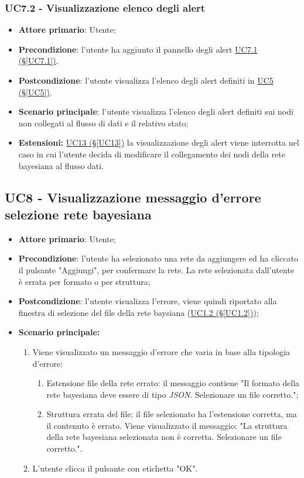 \subsubsection{UC7.2 - Visualizzazione elenco degli alert}\label{UC7.2}
\begin{itemize}
	\item \textbf{Attore primario}: Utente;
	\item \textbf{Precondizione}:  l'utente ha aggiunto il pannello degli alert \hyperref[UC7.1]{UC7.1 (§\ref*{UC7.1})}.
	\item \textbf{Postcondizione}: l'utente visualizza l'elenco degli alert definiti in  \hyperref[UC5]{UC5 (§\ref*{UC5})}.
	\item \textbf{Scenario principale}: l'utente visualizza l'elenco degli alert definiti sui nodi non collegati al flusso di dati e il relativo stato;
	\item \textbf{Estensioni:} \hyperref[UC13]{UC13 (§\ref*{UC13})} la visualizzazione degli alert viene interrotta nel caso in cui l'utente decida di modificare il collegamento dei nodi della rete bayesiana al flusso dati.
\end{itemize}


\pagebreak

\subsection{UC8 - Visualizzazione messaggio d'errore selezione  rete bayesiana}\label{UC8}
\begin{itemize}
\item \textbf{Attore primario}: Utente;
\item \textbf{Precondizione}: l'utente ha selezionato una rete da aggiungere ed ha cliccato il pulsante "Aggiungi", per confermare la rete. La rete selezionata dall'utente è errata per formato o per struttura;
\item \textbf{Postcondizione}: l'utente visualizza l'errore, viene quindi riportato alla finestra di selezione del file della rete baysiana (\hyperref[UC1.2]{UC1.2 (§\ref*{UC1.2})});
\item \textbf{Scenario principale:} 
	\begin{enumerate}
		\item Viene visualizzato un messaggio d'errore che varia in base alla tipologia d'errore:
			\begin{enumerate}
				\item Estensione file della rete errato: il messaggio contiene "Il formato della rete bayesiana deve essere di tipo \textit{JSON}. Selezionare un file corretto.";
				\item Struttura errata del file: il file selezionato ha l'estensione corretta, ma il contenuto è errato. Viene visualizzato il messaggio: "La struttura della rete bayesiana selezionata non è corretta. Selezionare un file corretto.".
			\end{enumerate}
		\item L'utente clicca il pulsante con etichetta "OK".
	\end{enumerate}
\end{itemize}

